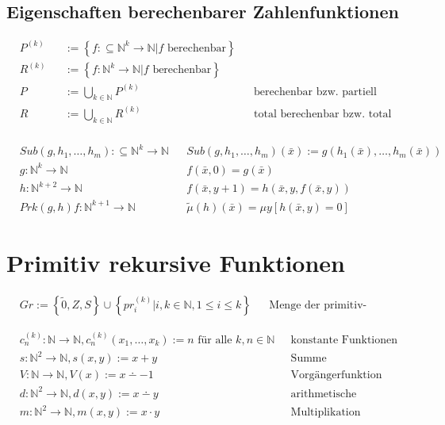 \documentclass[10pt,oneside,a4paper]{scrartcl}
\begin{document}
\subsection{Eigenschaften berechenbarer Zahlenfunktionen}

    \begin{align}
    &P^{(k)} &&:= \left\{f :\subseteq\mathbb{N}^k\longrightarrow
        \mathbb{N} | f \text{ berechenbar}\right\}\\
    &R^{(k)} &&:= \left\{f :\mathbb{N}^k\longrightarrow
        \mathbb{N} | f \text{ berechenbar}\right\}\\
    &P &&:= \bigcup_{k\in\mathbb{N}} P^{(k)}
        && \text{berechenbar bzw. partiell rekursiv}\\
    &R &&:= \bigcup_{k\in\mathbb{N}} R^{(k)}
        && \text{total berechenbar bzw. total rekursiv}\\
    \end{align}

    \begin{align}
    &Sub(g, h_1, \ldots, h_m) :\subseteq\mathbb{N}^k\longrightarrow \mathbb{N}
        &&Sub(g, h_1, \ldots, h_m)(\bar{x}) := g(h_1(\bar{x}), \ldots,
            h_m(\bar{x}))\\
    &g:\mathbb{N}^{k}\longrightarrow \mathbb{N} && f(\bar{x}, 0) = g(\bar{x})\\
    &h:\mathbb{N}^{k+2}\longrightarrow \mathbb{N} && f(\bar{x}, y+1) = h(
        \bar{x}, y, f(\bar{x}, y))\\
    &Prk(g,h) f : \mathbb{N}^{k+1} \longrightarrow \mathbb{N}
        &&\tilde{\mu}(h)(\bar{x}) = \mu y \left[ h(\bar{x}, y) = 0 \right]
    \end{align}

\section{Primitiv rekursive Funktionen}

    \begin{align}
    &Gr := \left\{\tilde{0}, Z, S\right\} \cup
           \left\{pr_i^{(k)}|i,k\in\mathbb{N}, 1\leq i\leq k\right\}
        && \text{Menge der primitiv-rekursiven Grundfunktionen (PRK)}
    \end{align}

    \begin{align}
    &c_n^{(k)} : \mathbb{N}\longrightarrow \mathbb{N},
        c_n^{(k)}(x_1,\ldots,x_k) := n \text{ für alle }k,n\in\mathbb{N}
        && \text{konstante Funktionen}\\
    &s : \mathbb{N}^2\longrightarrow \mathbb{N}, s(x, y) := x+y
        && \text{Summe}\\
    &V : \mathbb{N}\longrightarrow \mathbb{N}, V(x) := x \dotminus -1
        && \text{Vorgängerfunktion}\\
    &d : \mathbb{N}^2\longrightarrow \mathbb{N}, d(x, y) := x \dotminus y
        && \text{arithmetische Differenz}\\
    &m : \mathbb{N}^2\longrightarrow \mathbb{N}, m(x, y) := x \cdot y
        && \text{Multiplikation}
    \end{align}
\end{document}
